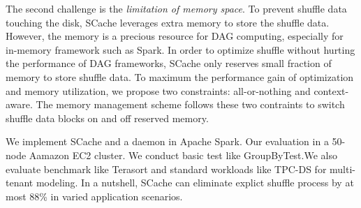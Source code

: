 The second challenge is the \textit{limitation of memory space}. To prevent shuffle data touching the disk, SCache leverages extra memory to store the shuffle data. However, the memory is a precious resource for DAG computing, especially for in-memory framework such as Spark\cite{spark}. In order to optimize shuffle without hurting the performance of DAG frameworks, SCache only reserves small fraction of memory to store shuffle data. To maximum the performance gain of optimization and memory utilization, we propose two constraints: all-or-nothing and context-aware. The memory management scheme follows these two contraints to switch shuffle data blocks on and off reserved memory.

We implement SCache and a daemon in Apache Spark\cite{apachespark}. Our evaluation in a 50-node Aamazon EC2 cluster. We conduct basic test like GroupByTest.We also evaluate benchmark like Terasort\cite{spark-tera} and standard workloads like TPC-DS\cite{tpcds} for multi-tenant modeling. In a nutshell, SCache can eliminate explict shuffle process by at most 88\% in varied application scenarios.




